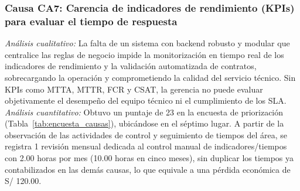 \subsubsection{Causa CA7: Carencia de indicadores de rendimiento (KPIs) para evaluar el tiempo de respuesta}
\noindent \textit{Análisis cualitativo:} La falta de un sistema con backend robusto y modular que centralice las reglas de negocio impide la monitorización en tiempo real de los indicadores de rendimiento y la validación automatizada de contratos, sobrecargando la operación y comprometiendo la calidad del servicio técnico. Sin KPIs como MTTA, MTTR, FCR y CSAT, la gerencia no puede evaluar objetivamente el desempeño del equipo técnico ni el cumplimiento de los SLA. \\

\noindent \textit{Análisis cuantitativo:}
Obtuvo un puntaje de 23 en la encuesta de priorización (Tabla~\ref{tab:encuesta_causas}), ubicándose en el séptimo lugar. A partir de la observación de las actividades de control y seguimiento de tiempos del área, se registra 1 revisión mensual dedicada al control manual de indicadores/tiempos con 2.00 horas por mes (10.00 horas en cinco meses), sin duplicar los tiempos ya contabilizados en las demás causas, lo que equivale a una pérdida económica de S/ 120.00.

